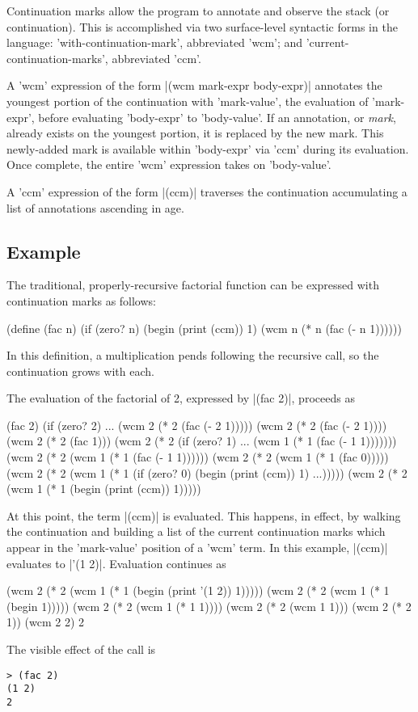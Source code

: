 \documentclass{llncs}
\begin{document}
Continuation marks allow the program to annotate and observe the stack (or continuation). This is accomplished via two surface-level syntactic forms in the language: \scheme'with-continuation-mark', abbreviated \scheme'wcm'; and \scheme'current-continuation-marks', abbreviated \scheme'ccm'.

A \scheme'wcm' expression of the form \scheme|(wcm mark-expr body-expr)| annotates the youngest portion of the continuation with \scheme'mark-value', the evaluation of \scheme'mark-expr', before evaluating \scheme'body-expr' to \scheme'body-value'. If an annotation, or \emph{mark}, already exists on the youngest portion, it is replaced by the new mark. This newly-added mark is available within \scheme'body-expr' via \scheme'ccm' during its evaluation. Once complete, the entire \scheme'wcm' expression takes on \scheme'body-value'.

A \scheme'ccm' expression of the form \scheme|(ccm)| traverses the continuation accumulating a list of annotations ascending in age.

\subsection{Example}

The traditional, properly-recursive factorial function can be expressed with continuation marks as follows:
\begin{schemedisplay}
(define (fac n)
  (if (zero? n)
      (begin
        (print (ccm))
        1)
      (wcm n (* n (fac (- n 1))))))
\end{schemedisplay}
In this definition, a multiplication pends following the recursive call, so the continuation grows with each.

The evaluation of the factorial of 2, expressed by \scheme|(fac 2)|, proceeds as
\begin{schemedisplay}
(fac 2)
(if (zero? 2) ... (wcm 2 (* 2 (fac (- 2 1)))))
(wcm 2 (* 2 (fac (- 2 1))))
(wcm 2 (* 2 (fac 1)))
(wcm 2 (* 2 (if (zero? 1) ... (wcm 1 (* 1 (fac (- 1 1)))))))
(wcm 2 (* 2 (wcm 1 (* 1 (fac (- 1 1))))))
(wcm 2 (* 2 (wcm 1 (* 1 (fac 0)))))
(wcm 2 (* 2 (wcm 1 (* 1 (if (zero? 0) (begin (print (ccm)) 1) ...)))))
(wcm 2 (* 2 (wcm 1 (* 1 (begin (print (ccm)) 1)))))
\end{schemedisplay}
At this point, the term \scheme|(ccm)| is evaluated. This happens, in effect, by walking the continuation and building a list of the current continuation marks which appear in the \scheme'mark-value' position of a \scheme'wcm' term. In this example, \scheme|(ccm)| evaluates to \scheme|'(1 2)|. Evaluation continues as
\begin{schemedisplay}
(wcm 2 (* 2 (wcm 1 (* 1 (begin (print '(1 2)) 1)))))
(wcm 2 (* 2 (wcm 1 (* 1 (begin 1)))))
(wcm 2 (* 2 (wcm 1 (* 1 1))))
(wcm 2 (* 2 (wcm 1 1)))
(wcm 2 (* 2 1))
(wcm 2 2)
2
\end{schemedisplay}
The visible effect of the call is
\begin{verbatim}
> (fac 2)
(1 2)
2
\end{verbatim}
\end{document}
